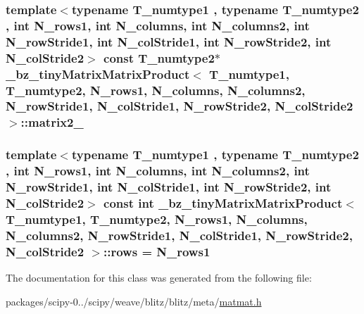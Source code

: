 \subsubsection[{matrix2\+\_\+}]{\setlength{\rightskip}{0pt plus 5cm}template$<$typename T\+\_\+numtype1 , typename T\+\_\+numtype2 , int N\+\_\+rows1, int N\+\_\+columns, int N\+\_\+columns2, int N\+\_\+row\+Stride1, int N\+\_\+col\+Stride1, int N\+\_\+row\+Stride2, int N\+\_\+col\+Stride2$>$ const T\+\_\+numtype2$\ast$ {\bf \+\_\+bz\+\_\+tiny\+Matrix\+Matrix\+Product}$<$ T\+\_\+numtype1, T\+\_\+numtype2, N\+\_\+rows1, N\+\_\+columns, N\+\_\+columns2, N\+\_\+row\+Stride1, N\+\_\+col\+Stride1, N\+\_\+row\+Stride2, N\+\_\+col\+Stride2 $>$\+::matrix2\+\_\+\hspace{0.3cm}{\ttfamily [protected]}}\label{class__bz__tinyMatrixMatrixProduct_a4626fdaee5660344f32f1a24ad58a910}
\hypertarget{class__bz__tinyMatrixMatrixProduct_a650ec336a01ae3f7b4d98105dca1aba3}{}
\subsubsection[{rows}]{\setlength{\rightskip}{0pt plus 5cm}template$<$typename T\+\_\+numtype1 , typename T\+\_\+numtype2 , int N\+\_\+rows1, int N\+\_\+columns, int N\+\_\+columns2, int N\+\_\+row\+Stride1, int N\+\_\+col\+Stride1, int N\+\_\+row\+Stride2, int N\+\_\+col\+Stride2$>$ const int {\bf \+\_\+bz\+\_\+tiny\+Matrix\+Matrix\+Product}$<$ T\+\_\+numtype1, T\+\_\+numtype2, N\+\_\+rows1, N\+\_\+columns, N\+\_\+columns2, N\+\_\+row\+Stride1, N\+\_\+col\+Stride1, N\+\_\+row\+Stride2, N\+\_\+col\+Stride2 $>$\+::rows = N\+\_\+rows1\hspace{0.3cm}{\ttfamily [static]}}\label{class__bz__tinyMatrixMatrixProduct_a650ec336a01ae3f7b4d98105dca1aba3}


The documentation for this class was generated from the following file\+:\begin{DoxyCompactItemize}
\item 
packages/scipy-\/0../scipy/weave/blitz/blitz/meta/\hyperlink{matmat_8h}{matmat.\+h}\end{DoxyCompactItemize}
